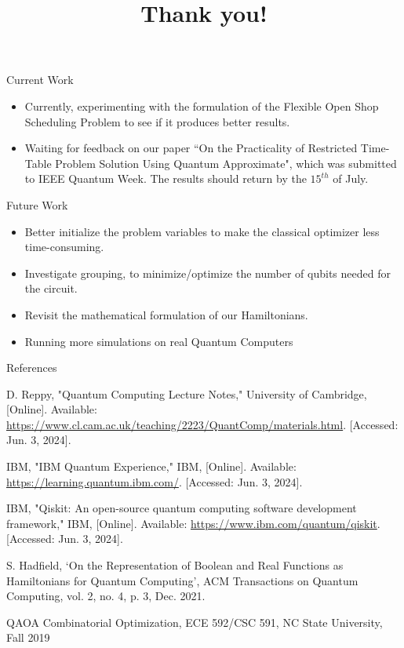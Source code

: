 \documentclass[14pt, aspectratio=169]{beamer}
\begin{document}
\begin{frame}{Current Work}
    \begin{itemize}
        \item Currently, experimenting with the formulation of the Flexible Open Shop Scheduling Problem to see if it produces better results.
        \item Waiting for feedback on our paper ``On the Practicality of Restricted Time-Table Problem Solution Using Quantum Approximate", which was submitted to IEEE Quantum Week. The results should return by the $15^{th}$ of July.
    \end{itemize}
\end{frame}

\begin{frame}{Future Work}
    \begin{itemize}
        \item Better initialize the problem variables to make the classical optimizer less time-consuming.
        \item Investigate grouping, to minimize/optimize the number of qubits needed for the circuit.
        \item Revisit the mathematical formulation of our Hamiltonians.
        \item Running more simulations on real Quantum Computers
    \end{itemize}
\end{frame}

\title{Thank you!}
\date{}
\author{}
\institute{}
\maketitle


\begin{frame}{References}
    \begin{thebibliography}{99}
        D. Reppy, "Quantum Computing Lecture Notes," University of Cambridge, [Online]. Available: \url{https://www.cl.cam.ac.uk/teaching/2223/QuantComp/materials.html}. [Accessed: Jun. 3, 2024].

        IBM, "IBM Quantum Experience," IBM, [Online]. Available: \url{https://learning.quantum.ibm.com/}. [Accessed: Jun. 3, 2024].

        IBM, "Qiskit: An open-source quantum computing software development framework," IBM, [Online]. Available: \url{https://www.ibm.com/quantum/qiskit}. [Accessed: Jun. 3, 2024].

        S. Hadfield, ‘On the Representation of Boolean and Real Functions as Hamiltonians for Quantum Computing’, ACM Transactions on Quantum Computing, vol. 2, no. 4, p. 3, Dec. 2021.

        QAOA Combinatorial Optimization, ECE 592/CSC 591, NC State University, Fall 2019
    \end{thebibliography}
\end{frame}
\end{document}
